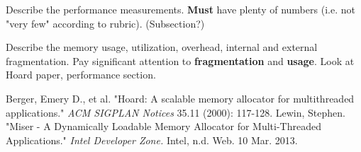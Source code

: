 \documentclass{article}
\begin{document}
Describe the performance measurements. \textbf{Must} have plenty of numbers 
(i.e. not "very few" according to rubric). (Subsection?)

Describe the memory usage, utilization, overhead, internal and external 
fragmentation. Pay significant attention to \textbf{fragmentation} and 
\textbf{usage}. Look at Hoard paper, performance section. 


\newpage

\begin{thebibliography}{9}
	
		Berger, Emery D., et al.
		"Hoard: A scalable memory allocator for multithreaded applications."
		\textit{ACM SIGPLAN Notices} 35.11 
		(2000): 
		117-128.
		Lewin, Stephen.
		"Miser - A Dynamically Loadable Memory Allocator for Multi-Threaded Applications."
		\textit{Intel Developer Zone.}
		Intel, 
		n.d. Web. 10 Mar. 2013.

\end{thebibliography}
\end{document}
